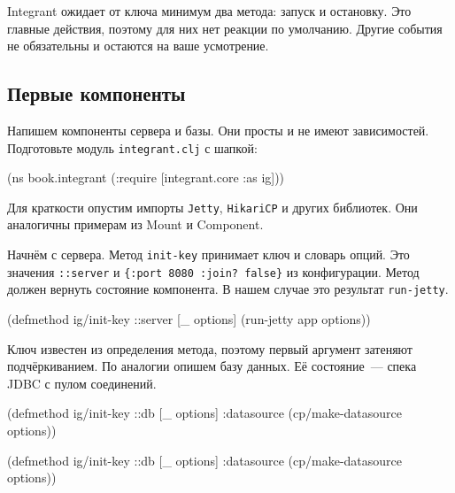 Integrant ожидает от ключа минимум два метода: запуск и остановку. Это главные
действия, поэтому для них нет реакции по умолчанию. Другие события не
обязательны и остаются на ваше усмотрение.

\subsection{Первые компоненты}


Напишем компоненты сервера и базы. Они просты и не имеют
зависимостей. Подготовьте модуль \verb|integrant.clj| с шапкой:

\begin{english}
  \begin{clojure}
(ns book.integrant
  (:require [integrant.core :as ig]))
  \end{clojure}
\end{english}

Для краткости опустим импорты \verb|Jetty|, \verb|HikariCP| и других
библиотек. Они аналогичны примерам из Mount и Component.

Начнём с сервера. Метод \verb|init-key| принимает ключ и словарь опций. Это
значения \verb|::server| и \verb|{:port 8080 :join? false}| из
конфигурации. Метод должен вернуть состояние компонента. В нашем случае это
результат \verb|run-jetty|.

\begin{english}
  \begin{clojure}
(defmethod ig/init-key ::server
  [_ options]
  (run-jetty app options))
  \end{clojure}
\end{english}


Ключ известен из определения метода, поэтому первый аргумент затеняют
подчёркиванием. По аналогии опишем базу данных. Её состояние~--- спека JDBC с
пулом соединений.

\ifx\DEVICETYPE\MOBILE

\begin{english}
  \begin{clojure}
(defmethod ig/init-key ::db
  [_ options]
  {:datasource
    (cp/make-datasource options)})
  \end{clojure}
\end{english}

\else

\begin{english}
  \begin{clojure}
(defmethod ig/init-key ::db
  [_ options]
  {:datasource (cp/make-datasource options)})
  \end{clojure}
\end{english}

